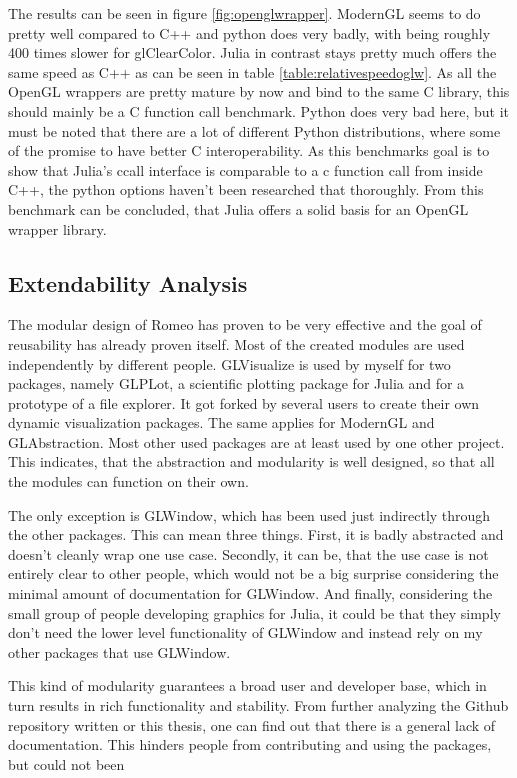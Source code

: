 The results can be seen in figure \ref{fig:openglwrapper}.
ModernGL seems to do pretty well compared to C++ and python does very badly, with being roughly 400 times slower for glClearColor.
Julia in contrast stays pretty much offers the same speed as C++ as can be seen in table \ref{table:relativespeedoglw}.
As all the OpenGL wrappers are pretty mature by now and bind to the same C library, this should mainly be a C function call benchmark.
Python does very bad here, but it must be noted that there are a lot of different Python distributions, where some of the promise to have better C interoperability. As this benchmarks goal is to show that Julia's ccall interface is comparable to a c function call from inside C++, the python options haven't been researched that thoroughly.
From this benchmark can be concluded, that Julia offers a solid basis for an \ac{OpenGL} wrapper library.


\subsection{Extendability Analysis}

The modular design of Romeo has proven to be very effective and the goal of reusability has already proven itself.
Most of the created modules are used independently by different people.
GLVisualize is used by myself for two packages, namely GLPLot, a scientific plotting package for Julia and for a prototype of a file explorer. 
It got forked by several users to create their own dynamic visualization packages.
The same applies for ModernGL and GLAbstraction. Most other used packages are at least used by one other project.
This indicates, that the abstraction and modularity is well designed, so that all the modules can function on their own.

The only exception is GLWindow, which has been used just indirectly through the other packages. 
This can mean three things.
First, it is badly abstracted and doesn't cleanly wrap one use case.
Secondly, it can be, that the use case is not entirely clear to other people, which would not be a big surprise considering the minimal amount of documentation for GLWindow.
And finally, considering the small group of people developing graphics for Julia, it could be that they simply don't need the lower level functionality of GLWindow and instead rely on my other packages that use GLWindow.

This kind of modularity guarantees a broad user and developer base, which in turn results in rich functionality and stability.
From further analyzing the Github repository written or this thesis, one can find out that there is a general lack of documentation.
This hinders people from contributing and using the packages, but could not been 

